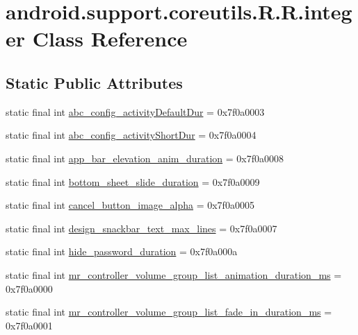 \hypertarget{classandroid_1_1support_1_1coreutils_1_1_r_1_1integer}{
\section{android.support.coreutils.R.R.integer Class Reference}
\label{classandroid_1_1support_1_1coreutils_1_1_r_1_1integer}
}
\subsection*{Static Public Attributes}
\begin{CompactItemize}
\item 
static final int \hyperlink{classandroid_1_1support_1_1coreutils_1_1_r_1_1integer_3682dac5df21b24ee0b4a19de45d340b}{abc\_\-config\_\-activityDefaultDur} = 0x7f0a0003
\item 
static final int \hyperlink{classandroid_1_1support_1_1coreutils_1_1_r_1_1integer_354a09776f4a0b8ec48017d07c6ae6dc}{abc\_\-config\_\-activityShortDur} = 0x7f0a0004
\item 
static final int \hyperlink{classandroid_1_1support_1_1coreutils_1_1_r_1_1integer_200d545e3013fbcfb3233e9a9a5d1198}{app\_\-bar\_\-elevation\_\-anim\_\-duration} = 0x7f0a0008
\item 
static final int \hyperlink{classandroid_1_1support_1_1coreutils_1_1_r_1_1integer_31acbc34ae71e077b94d576c24180138}{bottom\_\-sheet\_\-slide\_\-duration} = 0x7f0a0009
\item 
static final int \hyperlink{classandroid_1_1support_1_1coreutils_1_1_r_1_1integer_3581fb71be5b40a8595916b9064dfdbe}{cancel\_\-button\_\-image\_\-alpha} = 0x7f0a0005
\item 
static final int \hyperlink{classandroid_1_1support_1_1coreutils_1_1_r_1_1integer_80034ad547e4a99b9d065e887c271dec}{design\_\-snackbar\_\-text\_\-max\_\-lines} = 0x7f0a0007
\item 
static final int \hyperlink{classandroid_1_1support_1_1coreutils_1_1_r_1_1integer_f660a3a23e8e5da73faa77a619a82320}{hide\_\-password\_\-duration} = 0x7f0a000a
\item 
static final int \hyperlink{classandroid_1_1support_1_1coreutils_1_1_r_1_1integer_ea79b183d784042c222cfe9e81a6a89d}{mr\_\-controller\_\-volume\_\-group\_\-list\_\-animation\_\-duration\_\-ms} = 0x7f0a0000
\item 
static final int \hyperlink{classandroid_1_1support_1_1coreutils_1_1_r_1_1integer_d58f0e34e2cef951a624cdb9409709c5}{mr\_\-controller\_\-volume\_\-group\_\-list\_\-fade\_\-in\_\-duration\_\-ms} = 0x7f0a0001

\end{CompactItemize}
